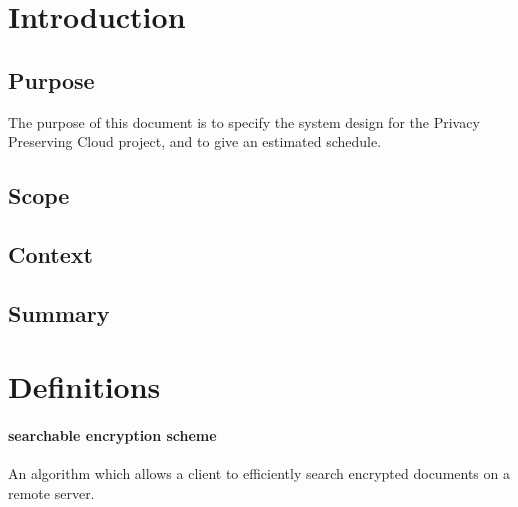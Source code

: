 \documentclass[onecolumn, draftclsnofoot,10pt, compsoc]{IEEEtran}
\begin{document}

%

\section{Introduction}

\subsection{ Purpose }

The purpose of this document is to specify the system design for the Privacy Preserving Cloud project, and to give an estimated schedule.

\subsection{ Scope }



\subsection{ Context }



\subsection{ Summary }


\section{ Definitions }

\paragraph*{\textbf{searchable encryption scheme}} An algorithm which allows a client to efficiently search encrypted documents on a remote server.
\end{document}

